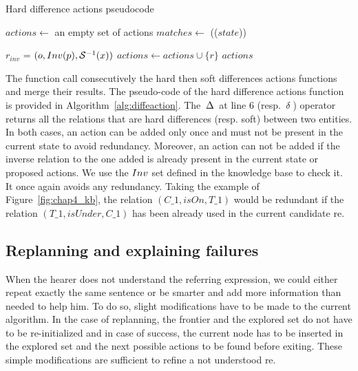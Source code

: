 \begin{algorithm}[ht!]
\caption{\label{alg:diffeaction} Hard difference actions pseudocode}
\begin{algorithmic}[1]
    \State $actions\leftarrow$ an empty set of actions
    \State $matches\leftarrow$ \sparqlresult(\toquery($state$))

                \State $r_{inv}$ = $(o, Inv(p), \mathcal{S}^{-1}(x))$
                    \State $\textit{actions} \gets \textit{actions} \cup \{r\}$
                \EndIf
            \EndFor
        \EndIf
    \EndFor
    \Return $actions$
\EndFunction
\end{algorithmic}
\end{algorithm}

The \differenceactions{} function call consecutively the hard then soft differences actions functions and merge their results. The pseudo-code of the hard difference actions function is provided in Algorithm~\ref{alg:diffeaction}. The $\,\Delta\,$ at line 6 (resp. $\,\delta\,$) operator returns all the relations that are hard differences (resp. soft) between two entities. In both cases, an action can be added only once and must not be present in the current state to avoid redundancy. Moreover, an action can not be added if the inverse relation to the one added is already present in the current state or proposed actions. We use the $Inv$ set defined in the knowledge base to check it. It once again avoids any redundancy. Taking the example of Figure~\ref{fig:chap4_kb}, the relation $(C\_1, isOn, T\_1)$ would be redundant if the relation $(T\_1, isUnder, C\_1)$ has been already used in the current candidate \acrshort{re}.

\subsection{Replanning and explaining failures}

When the hearer does not understand the referring expression, we could either repeat exactly the same sentence or be smarter and add more information than needed to help him. To do so, slight modifications have to be made to the current algorithm. In the case of replanning, the frontier and the explored set do not have to be re-initialized and in case of success, the current node has to be inserted in the explored set and the next possible actions to be found before exiting. These simple modifications are sufficient to refine a not understood \acrshort{re}.

